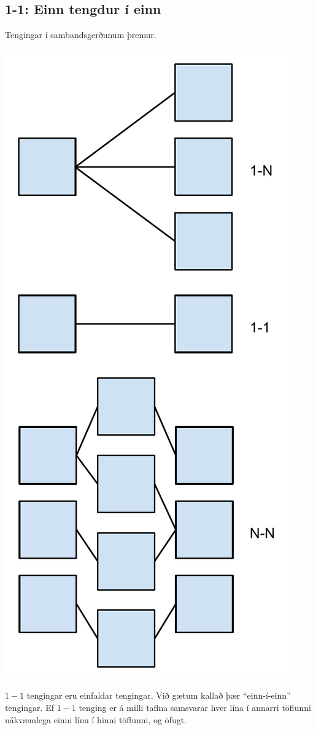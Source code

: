 \subsection{1-1: Einn tengdur í einn}
\begin{marginfigure}
\caption[Sambandsgerðir]{Tengingar í sambandsgerðunum þremur.}
\label{mynd:tengingar}
\centering
\includegraphics[width=\linewidth]{myndir/tengingar}
\end{marginfigure}
$1-1$ tengingar eru einfaldar tengingar. Við gætum kallað þær ``einn-í-einn'' tengingar. Ef $1-1$ tenging er á milli taflna samsvarar hver lína í annarri töflunni nákvæmlega einni línu í hinni töflunni, og öfugt.


